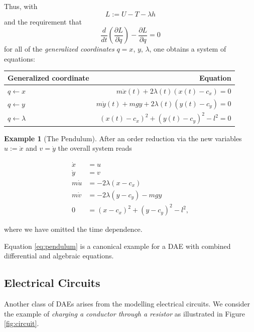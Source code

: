\documentclass[]{book}
\theoremstyle{definition}
\theoremstyle{definition}
\newtheorem{example}{Example}[chapter]
\theoremstyle{definition}
\theoremstyle{remark}
\begin{document}
Thus, with \[L:=U-T- \lambda h\] and the requirement that
\[
\frac{d}{dt}(\frac{\partial L}{\partial \dot q}) - \frac{\partial L}{\partial q} = 0
\]
for all of the \emph{generalized coordinates} \(q=x\), \(y\), \(\lambda\),
one obtains a system of equations:

\begin{longtable}[]{@{}lr@{}}
\toprule
Generalized coordinate & Equation\tabularnewline
\midrule
\endhead
\(q \leftarrow x\) & \(m\ddot x(t) + 2 \lambda(t) (x(t) - c_x) = 0\)\tabularnewline
\(q \leftarrow y\) & \(m\ddot y(t) + mgy + 2 \lambda(t) (y(t) - c_y) = 0\)\tabularnewline
\(q \leftarrow \lambda\) & \((x(t) - c_x)^2 + (y(t) - c_y)^2 - l^2 =0\)\tabularnewline
\bottomrule
\end{longtable}

\begin{example}[The Pendulum]
\protect\hypertarget{exm:the-pendulum}{}{\label{exm:the-pendulum} {} }
After an order reduction via the new variables \(u:=\dot x\) and \(v=\dot y\) the overall system reads

\begin{equation}
\begin{split}
\dot x &= u \\
\dot y &= v \\
m \dot u &= - 2 \lambda (x - c_x) \\ 
m \dot v &= - 2 \lambda (y - c_y) - mgy \\
0&=(x - c_x)^2 + (y - c_y)^2 - l^2, 
\end{split}
\label{eq:pendulum}
\end{equation}

where we have omitted the time dependence.
\end{example}

Equation \eqref{eq:pendulum} is a canonical example for a DAE with combined differential and algebraic equations.

\hypertarget{electrical-circuits}{%
\subsection*{Electrical Circuits}\label{electrical-circuits}}

Another class of DAEs arises from the modelling electrical circuits. We consider the example of \emph{charging a conductor through a resistor} as illustrated in Figure \ref{fig:circuit}.
\end{document}
